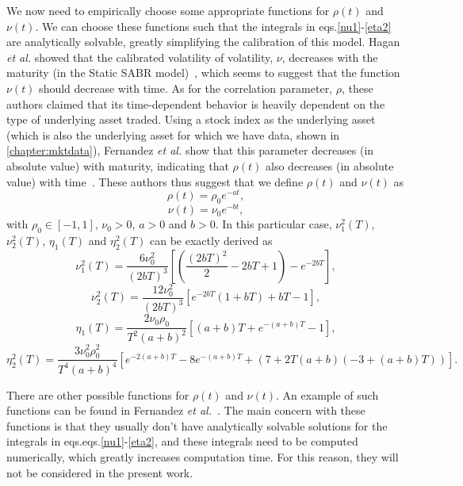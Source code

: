 We now need to empirically choose some appropriate functions for $\rho(t)$ and $\nu(t)$.
We can choose these functions such that the integrals in eqs.\eqref{nu1}-\eqref{eta2} are analytically  solvable, greatly simplifying the calibration of this model. Hagan \textit{et al.} showed that the calibrated volatility of volatility, $\nu$, decreases with the maturity (in the Static SABR model)~\citep{Hagan}, which seems to suggest that the function $\nu(t)$ should decrease with time. As for the correlation parameter, $\rho$, these authors claimed that its time-dependent behavior is heavily dependent on the type of underlying asset traded. Using a stock index as the underlying asset (which is also the underlying asset for which we have data, shown in \autoref{chapter:mktdata}), Fernandez \textit{et al.} show that this parameter decreases (in absolute value) with maturity, indicating that $\rho(t)$ also decreases (in absolute value) with time~\citep{Fernandez}.
These authors thus suggest that we define $\rho(t)$ and $\nu(t)$ as
\begin{equation}\label{rhot}
\rho(t)=\rho_0e^{-at},
\end{equation}
\begin{equation}\label{nut}
\nu(t)=\nu_0e^{-bt},
\end{equation}
\noindent with $\rho_0\in[-1,1]$, $\nu_0>0$, $a>0$ and $b>0$.
In this particular case, $\nu_1^2(T)$, $\nu_2^2(T)$, $\eta_1(T)$ and $\eta_2^2(T)$ can be exactly derived as
\begin{equation}
\nu_1^2(T)=\frac{6\nu_0^2}{(2bT)^3}\left[\left(\frac{(2bT)^2}{2}-2bT+1\right)-e^{-2bT}\right],
\end{equation}
\begin{equation}
\nu_2^2(T)=\frac{12\nu_0^2}{(2bT)^3}\left[e^{-2bT}(1+bT)+bT-1\right],
\end{equation}
\begin{equation}
\eta_1(T)=\frac{2\nu_0\rho_0}{T^2(a+b)^2}\left[(a+b)T+e^{-(a+b)T}-1\right],
\end{equation}
\begin{equation}
\eta_2^2(T)=\frac{3\nu_0^2\rho_0^2}{T^4(a+b)^4}\left[e^{-2(a+b)T}-8e^{-(a+b)T}+(7+2T(a+b)(-3+(a+b)T))\right].
\end{equation}

There are other possible functions for $\rho(t)$ and $\nu(t)$. An example of such functions can be found in Fernandez \textit{et al.}~\citep{Fernandez}. The main concern with these functions is that they usually don't have analytically solvable solutions for the integrals in eqs.eqs.\eqref{nu1}-\eqref{eta2}, and these integrals need to be computed numerically, which greatly increases computation time. For this reason, they will not be considered in the present work.
